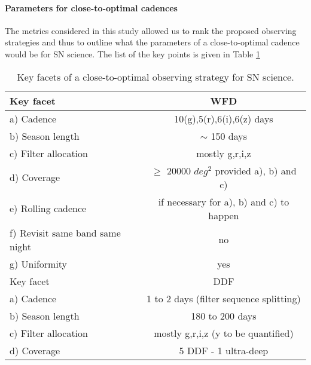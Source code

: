 \paragraph{Parameters for close-to-optimal cadences} The metrics considered in this study allowed us to rank the proposed observing strategies and thus to outline what the parameters of a close-to-optimal cadence would be for SN science. The list of the key points is given in Table \ref{tab:optimal_strategy}

\begin{table}[!htbp]
  \begin{center}
    \caption{Key facets of a close-to-optimal observing strategy for SN science.}\label{tab:optimal_strategy}
\begin{tabular}{l|c}
  \hline
  \hline
 Key facet & WFD \\
 \hline
a) Cadence                      & 10(g),5(r),6(i),6(z) days \\
b) Season length                & $\sim$ 150 days               \\
c) Filter allocation            & mostly g,r,i,z            \\
d) Coverage                     & $\geq$ 20000 $deg^2$ provided a), b) and c) \\
e) Rolling cadence              & if necessary for a), b) and c) to happen \\
f) Revisit same band same night & no \\
g) Uniformity                   & yes \\
\hline
 \hline
 Key facet & DDF \\
 \hline
a) Cadence                      & 1 to 2 days (filter sequence splitting) \\
b) Season length                & 180 to 200 days \\
c) Filter allocation            & mostly g,r,i,z (y to be quantified) \\
d) Coverage                     & 5 DDF - 1 ultra-deep \\
\hline
 \end{tabular}
\end{center}
\end{table}


